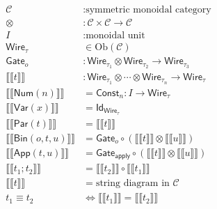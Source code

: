 \documentclass[11pt,oneside]{article}
\begin{document}
\begin{align}
\mathcal{C} &: \text{symmetric monoidal category} \\[6pt]
\otimes &: \mathcal{C}\times\mathcal{C}\to\mathcal{C} \\[6pt]
I &: \text{monoidal unit} \\[10pt]

\mathsf{Wire}_\tau
&\in \mathrm{Ob}(\mathcal{C})
\\[10pt]

\mathsf{Gate}_o
&:
\mathsf{Wire}_{\tau_1}\otimes \mathsf{Wire}_{\tau_2}
\to
\mathsf{Wire}_{\tau_3}
\\[12pt]

\llbracket\!\llbracket t \rrbracket\!\rrbracket
&:
\mathsf{Wire}_{\tau_1}\otimes\cdots\otimes\mathsf{Wire}_{\tau_n}
\to
\mathsf{Wire}_{\tau}
\\[14pt]

\llbracket\!\llbracket \mathsf{Num}(n) \rrbracket\!\rrbracket
&=
\mathsf{Const}_n : I \to \mathsf{Wire}_{\tau}
\\[12pt]

\llbracket\!\llbracket \mathsf{Var}(x) \rrbracket\!\rrbracket
&=
\mathsf{Id}_{\mathsf{Wire}_{\tau}}
\\[12pt]

\llbracket\!\llbracket \mathsf{Par}(t) \rrbracket\!\rrbracket
&=
\llbracket\!\llbracket t \rrbracket\!\rrbracket
\\[12pt]

\llbracket\!\llbracket \mathsf{Bin}(o,t,u) \rrbracket\!\rrbracket
&=
\mathsf{Gate}_o
\circ
\left(
\llbracket\!\llbracket t \rrbracket\!\rrbracket
\otimes
\llbracket\!\llbracket u \rrbracket\!\rrbracket
\right)
\\[14pt]

\llbracket\!\llbracket \mathsf{App}(t,u) \rrbracket\!\rrbracket
&=
\mathsf{Gate}_{\mathsf{apply}}
\circ
\left(
\llbracket\!\llbracket t \rrbracket\!\rrbracket
\otimes
\llbracket\!\llbracket u \rrbracket\!\rrbracket
\right)
\\[14pt]

\llbracket\!\llbracket t_1;t_2 \rrbracket\!\rrbracket
&=
\llbracket\!\llbracket t_2 \rrbracket\!\rrbracket
\circ
\llbracket\!\llbracket t_1 \rrbracket\!\rrbracket
\\[14pt]

\llbracket\!\llbracket t \rrbracket\!\rrbracket
&=
\text{string diagram in }\mathcal{C}
\\[12pt]

t_1 \equiv t_2
&\Longleftrightarrow
\llbracket\!\llbracket t_1 \rrbracket\!\rrbracket
=
\llbracket\!\llbracket t_2 \rrbracket\!\rrbracket
\end{align}
\end{document}
